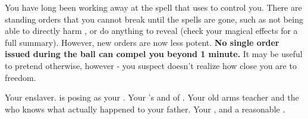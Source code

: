 \documentclass[char]{NeptuneBall}
\begin{document}
\begin{itemz}[Note]
  \item You have long been working away at the spell that \cWitch{} uses to control you. There are standing orders that you cannot break until the spells are gone, such as not being able to directly harm \cWitch{\them}, or do anything to reveal \cWitch{\them} (check your magical effects for a full summary). However, new orders are now less potent. {\bf No single order issued during the ball can compel you beyond 1 minute.} It may be useful to pretend otherwise, however - you suspect \cWitch{} doesn't realize how close you are to freedom.
\end{itemz}

\begin{contacts}
  \contact{\cWitch{}} Your enslaver. \cWitch{\They} is posing as your \cWitch{\spouse}.
  \contact{\cAriel{}} Your \cEric{\sibling}'s \cAriel{\spouse} and \cAriel{\King} of \pAmerica{}.
  \contact{\cGeneral{}} Your old arms teacher and the \cGeneral{\mer} who knows what actually happened to your father.
  \contact{\cKing{}} Your \cKing{\King}, and a reasonable \cKing{\mer}.
\end{contacts}
\end{document}
